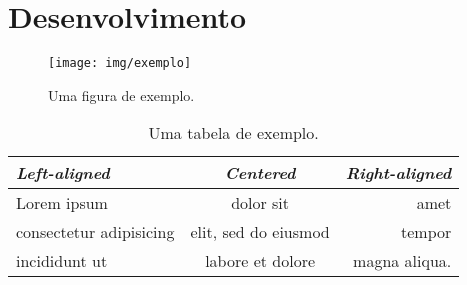 \chapter{Desenvolvimento}

\begin{figure}[ht]
    \centering
    \texttt{[image: img/exemplo]}
    \caption{Uma figura de exemplo.}
\end{figure}

\begin{table}[ht]
    \caption{Uma tabela de exemplo.}
    {\centering
    \begin{tabular}{lcr} \toprule
    \emph{Left-aligned} & \emph{Centered} & \emph{Right-aligned} \\ \midrule
    Lorem ipsum & dolor sit & amet \\
    consectetur adipisicing & elit, sed do eiusmod & tempor \\
    incididunt ut & labore et dolore & magna aliqua. \\ \bottomrule
    \end{tabular}\par
    }
\end{table}
